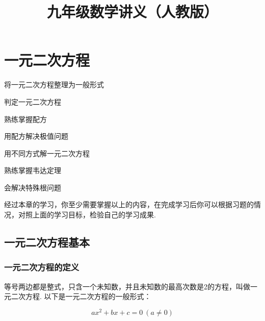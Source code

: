 \documentclass[lang=cn, 10pt, titlestyle=hang, oneside]{elegantbook}
\title{九年级数学讲义（人教版）}
\begin{document}
\tableofcontents

\chapter{一元二次方程}



\begin{introduction}

\item 将一元二次方程整理为一般形式
\item 判定一元二次方程
\item 熟练掌握配方
\item 用配方解决极值问题
\item 用不同方式解一元二次方程
\item 熟练掌握韦达定理
\item 会解决特殊根问题

\end{introduction}

经过本章的学习，你至少需要掌握以上的内容，在完成学习后你可以根据习题的情况，对照上面的学习目标，检验自己的学习成果.

\section{一元二次方程基本}
\subsection{一元二次方程的定义}


\begin{definition}[一元二次方程的定义]
  
等号两边都是整式，只含一个未知数，并且未知数的最高次数是2的方程，叫做一元二次方程. 以下是一元二次方程的一般形式：

\begin{equation}
    ax^2 + bx + c = 0 \ (a \neq 0)
    \label{general_formula}
\end{equation}

 
\end{definition}
\end{document}
